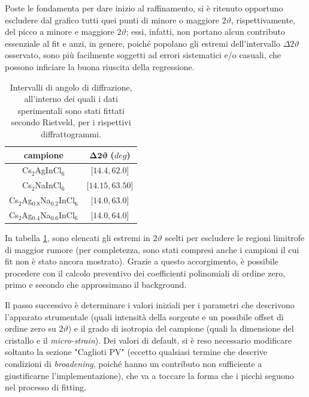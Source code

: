 \documentclass[a4paper,twocolumn,12 pt]{article}
\begin{document}
Poste le fondamenta per dare inizio al raffinamento, si è ritenuto opportuno escludere dal grafico tutti quei punti di minore o maggiore $2\vartheta$, rispettivamente, del picco a minore e maggiore $2\vartheta$; essi, infatti, non portano alcun contributo essenziale al fit e anzi, in genere, poiché popolano gli estremi dell'intervallo $\Delta 2\vartheta$ osservato, sono più facilmente soggetti ad errori sistematici e/o casuali, che possono inficiare la buona riuscita della regressione.
\begin{center}
\begin{table}[htbp]\setlength\belowcaptionskip{-20pt}
    \centering
\begin{tabular}{cc}
    \hline
    \textbf{campione} & $\mathbf{\Delta 2 \vartheta}$ ($deg$) \\
    \hline
    Cs$_2$AgInCl$_6$ & $\lbrack14.4, 62.0\rbrack$\\
    Cs$_2$NaInCl$_6$ & $\lbrack14.15, 63.50\rbrack$\\
    Cs$_2$Ag$_{0.8}$Na$_{0.2}$InCl$_6$ & $\lbrack14.0, 63.0\rbrack$\\
    Cs$_2$Ag$_{0.4}$Na$_{0.6}$InCl$_6$ & $\lbrack14.0, 64.0\rbrack$\\
    \hline
\end{tabular}
\caption{Intervalli di angolo di diffrazione, all'interno dei quali i dati sperimentali sono stati fittati secondo Rietveld, per i rispettivi diffrattogrammi.}
\label{tab: delta2theta}
\end{table}
\end{center}

\noindent In tabella \ref{tab: delta2theta}, sono elencati gli estremi in $2\vartheta$ scelti per escludere le regioni limitrofe di maggior rumore (per completezza, sono stati compresi anche i campioni il cui fit non è stato ancora mostrato). Grazie a questo accorgimento, è possibile procedere con il calcolo preventivo dei coefficienti polinomiali di ordine zero, primo e secondo che approssimano il background.

Il passo successivo è determinare i valori iniziali per i parametri che descrivono l'apparato strumentale (quali intensità della sorgente e un possibile offset di ordine zero su $2\vartheta$) e il grado di isotropia del campione (quali la dimensione del cristallo e il \emph{micro-strain}). Dei valori di default, si è reso necessario modificare soltanto la sezione "Caglioti PV" (eccetto qualsiasi termine che descrive condizioni di \emph{broadening}, poiché hanno un contributo non sufficiente a giustificarne l'implementazione), che va a toccare la forma che i picchi seguono nel processo di fitting.
\end{document}

